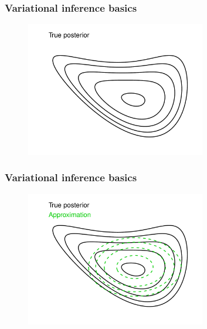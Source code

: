 \documentclass{beamer}
\begin{document}
\begin{frame}
  \frametitle{Variational inference basics}

  \begin{figure}
  \begin{center}
  \includegraphics[width=0.7\textwidth]{VBexample1.pdf}
  \end{center}
  \end{figure}

\end{frame}

\begin{frame}
  \frametitle{Variational inference basics}

  \begin{figure}
  \begin{center}
  \includegraphics[width=0.7\textwidth]{VBexample2.pdf}
  \end{center}
  \end{figure}

\end{frame}
\end{document}
